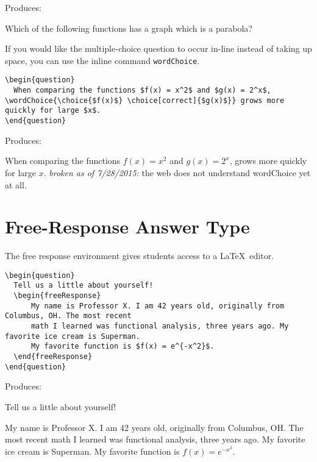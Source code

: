 \documentclass{ximera}
\begin{document}
Produces:

\begin{question}
  Which of the following functions has a graph which is a parabola?
  \begin{multipleChoice}
  \end{multipleChoice}
\end{question}


If you would like the multiple-choice question to occur in-line instead of taking up space, you can use the inline command \verb!wordChoice!.
 
\begin{verbatim}
\begin{question}
  When comparing the functions $f(x) = x^2$ and $g(x) = 2^x$, \wordChoice{\choice{$f(x)$} \choice[correct]{$g(x)$}} grows more quickly for large $x$.
\end{question}
\end{verbatim}

Produces:

\begin{question}
  When comparing the functions $f(x) = x^2$ and $g(x) = 2^x$,  grows more quickly for large $x$.
  \emph{broken as of 7/28/2015:} the web does not understand wordChoice yet at all.
\end{question}

\section{Free-Response Answer Type}

The free response environment gives students access to a \LaTeX\ editor. 

\begin{verbatim}
\begin{question}
  Tell us a little about yourself!
  \begin{freeResponse}
      My name is Professor X. I am 42 years old, originally from Columbus, OH. The most recent 
      math I learned was functional analysis, three years ago. My favorite ice cream is Superman. 
      My favorite function is $f(x) = e^{-x^2}$.
  \end{freeResponse}
\end{question}
\end{verbatim}

Produces:

\begin{question}
  Tell us a little about yourself!
  \begin{freeResponse}
      My name is Professor X. I am 42 years old, originally from Columbus, OH. The most recent 
      math I learned was functional analysis, three years ago. My favorite ice cream is Superman. 
      My favorite function is $f(x) = e^{-x^2}.$
  \end{freeResponse}
\end{question}
\end{document}
